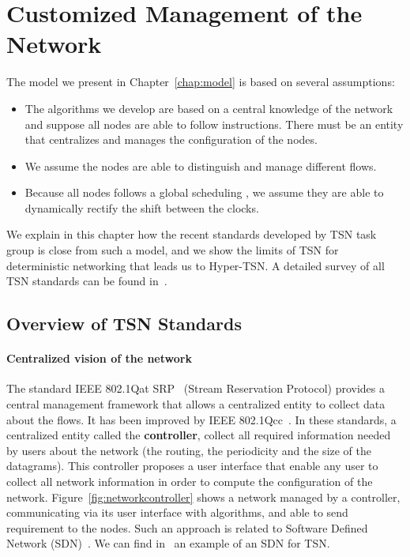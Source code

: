 \section{Customized Management of the Network}
\label{sec:TSNqbv}


The model we present in Chapter~\ref{chap:model} is based on several assumptions:
\begin{itemize}
\item The algorithms we develop are based on a central knowledge of the network and suppose all nodes are able to follow instructions. There must be an entity that centralizes and manages the configuration of the nodes.
\item We assume the nodes are able to distinguish and manage different flows.
\item Because all nodes follows a global scheduling , we assume they are able to dynamically rectify the shift between the clocks.
\end{itemize}

We explain in this chapter how the recent standards developed by TSN task group is close from such a model, and we show the limits of TSN for deterministic networking that leads us to Hyper-TSN. A detailed survey of all TSN standards can be found in~\cite{8458130}. 


\subsection{Overview of TSN Standards}


\paragraph{Centralized vision of the network}
The standard IEEE 802.1Qat SRP~\cite{article} (Stream Reservation Protocol) provides a central management framework that allows a centralized entity to collect data about the flows. It has been improved by IEEE 802.1Qcc~\cite{6755436}. In these standards, a centralized entity called the \textbf{controller}, collect all required information needed by users about the network (the routing, the periodicity and the size of the datagrams). This controller proposes a user interface that enable any user to collect all network information in order to compute the configuration of the network. Figure~\ref{fig:networkcontroller} shows a network managed by a controller, communicating via its user interface with algorithms, and able to send requirement to the nodes. Such an approach is related to Software Defined Network (SDN)~\cite{li2015software}. We can find in~\cite{7356556} an example of an SDN for TSN.


